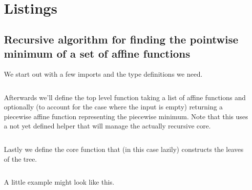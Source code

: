 \chapter{Listings}

\section{Recursive algorithm for finding the pointwise minimum of a set of affine functions}
\label{sec:pointwise-min-rec-py}

We start out with a few imports and the type definitions we need.

\inputminted[firstline=1, lastline=25]{python}{listings/pointwise_min_rec.py}

Afterwards we'll define the top level function taking a list of affine functions and optionally (to account for the case where the input is empty) returning a piecewise affine function representing the piecewise minimum. Note that this uses a not yet defined helper that will manage the actually recursive core.

\inputminted[firstline=28, lastline=48]{python}{listings/pointwise_min_rec.py}

Lastly we define the core function that (in this case lazily) constructs the leaves of the tree.

\inputminted[firstline=51, lastline=79]{python}{listings/pointwise_min_rec.py}

A little example might look like this.

\inputminted[firstline=83, lastline=84]{python}{listings/pointwise_min_rec.py}